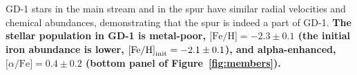 \documentclass[twocolumn]{aastex63}
\newcommand{\feh}{\ensuremath{\textrm{[Fe/H]}}}
\newcommand{\afe}{\ensuremath{\textrm{[$\alpha$/Fe]}}}
\newcommand{\changes}[1]{{\textbf{#1}}}
\begin{document}
GD-1 stars in the main stream and in the spur have similar radial velocities and chemical abundances, demonstrating that the spur is indeed a part of GD-1.
\changes{
The stellar population in GD-1 is metal-poor, $\feh=-2.3\pm0.1$ (the initial iron abundance is lower, $\feh_{\rm init}=-2.1\pm0.1$), and alpha-enhanced, $\afe=0.4\pm0.2$ (bottom panel of Figure~\ref{fig:members}).
% 
}
\end{document}
